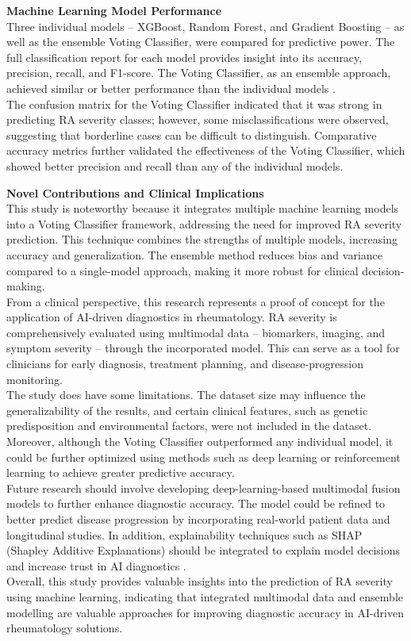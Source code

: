\documentclass[10pt]{NSP1}
\begin{document}
	\textbf{Machine Learning Model Performance}\\
	Three individual models -- XGBoost, Random Forest, and Gradient Boosting -- as well as the ensemble Voting Classifier, were compared for predictive power. The full classification report for each model provides insight into its accuracy, precision, recall, and F1-score. The Voting Classifier, as an ensemble approach, achieved similar or better performance than the individual models \cite{wang2022m2stan}.\\
	The confusion matrix for the Voting Classifier indicated that it was strong in predicting RA severity classes; however, some misclassifications were observed, suggesting that borderline cases can be difficult to distinguish. Comparative accuracy metrics further validated the effectiveness of the Voting Classifier, which showed better precision and recall than any of the individual models.
	
	\textbf{Novel Contributions and Clinical Implications}\\
	This study is noteworthy because it integrates multiple machine learning models into a Voting Classifier framework, addressing the need for improved RA severity prediction. This technique combines the strengths of multiple models, increasing accuracy and generalization. The ensemble method reduces bias and variance compared to a single-model approach, making it more robust for clinical decision-making.\\
	From a clinical perspective, this research represents a proof of concept for the application of AI-driven diagnostics in rheumatology. RA severity is comprehensively evaluated using multimodal data -- biomarkers, imaging, and symptom severity -- through the incorporated model. This can serve as a tool for clinicians for early diagnosis, treatment planning, and disease-progression monitoring.\\
	The study does have some limitations. The dataset size may influence the generalizability of the results, and certain clinical features, such as genetic predisposition and environmental factors, were not included in the dataset. Moreover, although the Voting Classifier outperformed any individual model, it could be further optimized using methods such as deep learning or reinforcement learning to achieve greater predictive accuracy.\\
	Future research should involve developing deep-learning-based multimodal fusion models to further enhance diagnostic accuracy. The model could be refined to better predict disease progression by incorporating real-world patient data and longitudinal studies. In addition, explainability techniques such as SHAP (Shapley Additive Explanations) should be integrated to explain model decisions and increase trust in AI diagnostics \cite{skaramagkas2023multi}.\\
	Overall, this study provides valuable insights into the prediction of RA severity using machine learning, indicating that integrated multimodal data and ensemble modelling are valuable approaches for improving diagnostic accuracy in AI-driven rheumatology solutions.
	
\end{document}
